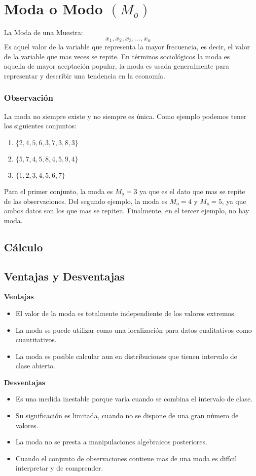 \section{Moda o Modo $(M_o)$}
La Moda de una Muestra:
$$x_1,x_2,x_3,\ldots,x_n$$
Es aquel valor de la variable que representa la mayor frecuencia, es decir, el valor de la variable que mas veces se repite. En términos sociológicos la moda es aquella de mayor aceptación popular, la moda es usada generalmente para representar y describir una tendencia en la economía.
\subsubsection{Observación}
La moda no siempre existe y no siempre es única.
Como ejemplo podemos tener los siguientes conjuntos:
\begin{enumerate}
\item $\{ 2,4,5,6,3,7,3,8,3\}$
\item $\{5,7,4,5,8,4,5,9,4\}$
\item $\{1,2,3,4,5,6,7\}$
\end{enumerate}
Para el primer conjunto, la moda es $M_o=3$ ya que es el dato que mas se repite de las observaciones. Del segundo ejemplo, la moda es $M_o=4$ y $M_o=5$, ya que ambos datos son los que mas se repiten. Finalmente, en el tercer ejemplo, no hay moda.
\subsection{Cálculo}
\subsection{Ventajas y Desventajas}
\begin{multicols}{2}
\textbf{Ventajas}
\begin{itemize}
\item El valor de la moda es totalmente independiente de los valores extremos.
\item La moda se puede utilizar como una localización para datos cualitativos como cuantitativos.
\item La moda es posible calcular aun en distribuciones que tienen intervalo de clase abierto.
\end{itemize}
\columnbreak
\textbf{Desventajas}
\begin{itemize}
\item Es una medida inestable porque varía cuando se combina el intervalo de clase.
\item Su significación es limitada, cuando no se dispone de una gran número de valores.
\item La moda no se presta a manipulaciones algebraicos posteriores.
\item Cuando el conjunto de observaciones contiene mas de una moda es difícil interpretar y de comprender.
\end{itemize}
\end{multicols}